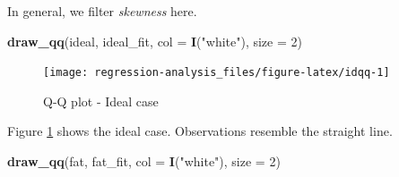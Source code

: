 \documentclass[]{book}
\newenvironment{Shaded}{\begin{snugshade}}{\end{snugshade}}
\newcommand{\ControlFlowTok}[1]{\textcolor[rgb]{0.13,0.29,0.53}{\textbf{#1}}}
\newcommand{\DataTypeTok}[1]{\textcolor[rgb]{0.13,0.29,0.53}{#1}}
\newcommand{\DecValTok}[1]{\textcolor[rgb]{0.00,0.00,0.81}{#1}}
\newcommand{\KeywordTok}[1]{\textcolor[rgb]{0.13,0.29,0.53}{\textbf{#1}}}
\newcommand{\NormalTok}[1]{#1}
\newcommand{\OperatorTok}[1]{\textcolor[rgb]{0.81,0.36,0.00}{\textbf{#1}}}
\newcommand{\StringTok}[1]{\textcolor[rgb]{0.31,0.60,0.02}{#1}}
\theoremstyle{definition}
\theoremstyle{definition}
\theoremstyle{definition}
\theoremstyle{remark}
\begin{document}
In general, we filter \emph{skewness} here.

\begin{Shaded}
\end{Shaded}

\begin{Shaded}
\begin{Highlighting}[]
\KeywordTok{draw_qq}\NormalTok{(ideal, ideal_fit, }\DataTypeTok{col =} \KeywordTok{I}\NormalTok{(}\StringTok{"white"}\NormalTok{), }\DataTypeTok{size =} \DecValTok{2}\NormalTok{)}
\end{Highlighting}
\end{Shaded}

\begin{figure}[H]

{\centering \texttt{[image: regression-analysis\_files/figure-latex/idqq-1]} 

}

\caption{Q-Q plot - Ideal case}\label{fig:idqq}
\end{figure}

Figure \ref{fig:idqq} shows the ideal case. Observations resemble the straight line.

\begin{Shaded}
\begin{Highlighting}[]
\KeywordTok{draw_qq}\NormalTok{(fat, fat_fit, }\DataTypeTok{col =} \KeywordTok{I}\NormalTok{(}\StringTok{"white"}\NormalTok{), }\DataTypeTok{size =} \DecValTok{2}\NormalTok{)}
\end{Highlighting}
\end{Shaded}
\end{document}
